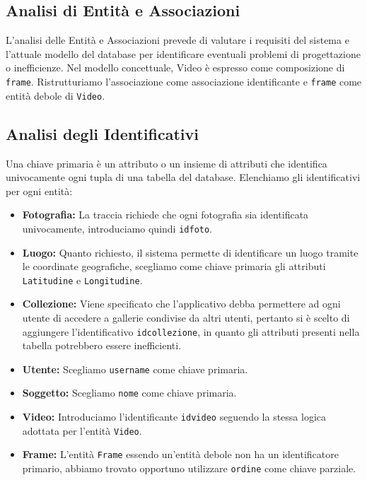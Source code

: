 \documentclass[a4paper,12pt,oneside]{book}
\begin{document}
    \subsection{Analisi di Entità e Associazioni}
    L'analisi delle Entità e Associazioni prevede di valutare i requisiti del sistema e l'attuale modello del database per identificare eventuali problemi di progettazione o inefficienze. Nel modello concettuale, Video è espresso come composizione di \texttt{frame}. Ristrutturiamo l'associazione come associazione identificante e \texttt{frame} come entità debole di \texttt{Video}.
    
    \subsection{Analisi degli Identificativi}
    Una chiave primaria è un attributo o un insieme di attributi che identifica univocamente ogni tupla di una tabella del database. Elenchiamo gli identificativi per ogni entità:\par
    \begin{itemize}
        \item \textbf{Fotografia:} La traccia richiede che ogni fotografia sia identificata univocamente, introduciamo quindi \texttt{id\textunderscore foto}.
        
        \item \textbf{Luogo:} Quanto richiesto, il sistema permette di identificare un luogo tramite le coordinate geografiche, scegliamo come chiave primaria gli attributi \texttt{Latitudine} e \texttt{Longitudine}.
        
        \item \textbf{Collezione:} Viene specificato che l'applicativo debba permettere ad ogni utente di accedere a gallerie condivise da altri utenti, pertanto si è scelto di aggiungere l'identificativo \texttt{id\textunderscore collezione}, in quanto gli attributi presenti nella tabella potrebbero essere inefficienti.
        
        \item \textbf{Utente:} Scegliamo \texttt{username} come chiave primaria.
        \item \textbf{Soggetto:} Scegliamo \texttt{nome} come chiave primaria.
        \item \textbf{Video:} Introduciamo l'identificante \texttt{id\textunderscore video} seguendo la stessa logica adottata per l'entità \texttt{Video}.
        \item \textbf{Frame:} L'entità \texttt{Frame} essendo un'entità debole non ha un identificatore primario, abbiamo trovato opportuno utilizzare \texttt{ordine} come chiave parziale.
    \end{itemize}
    
\end{document}
